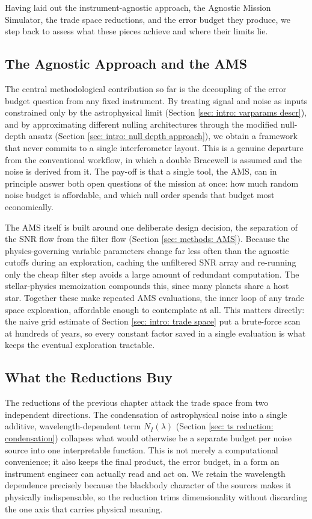 \documentclass[12pt,a4paper]{article}
\numberwithin{equation}{section}
\numberwithin{figure}{section}
\numberwithin{table}{section}
\begin{document}
Having laid out the instrument-agnostic approach, the Agnostic Mission Simulator, the trade space reductions, and the error budget they produce, we step back to assess what these pieces achieve and where their limits lie.

\subsection{The Agnostic Approach and the AMS}
The central methodological contribution so far is the decoupling of the error budget question from any fixed instrument. By treating signal and noise as inputs constrained only by the astrophysical limit (Section \ref{sec: intro: varparams descr}), and by approximating different nulling architectures through the modified null-depth ansatz (Section \ref{sec: intro: null depth approach}), we obtain a framework that never commits to a single interferometer layout. This is a genuine departure from the conventional workflow, in which a double Bracewell is assumed and the noise is derived from it. The pay-off is that a single tool, the AMS, can in principle answer both open questions of the mission at once: how much random noise budget is affordable, and which null order spends that budget most economically.

The AMS itself is built around one deliberate design decision, the separation of the SNR flow from the filter flow (Section \ref{sec: methods: AMS}). Because the physics-governing variable parameters change far less often than the agnostic cutoffs during an exploration, caching the unfiltered SNR array and re-running only the cheap filter step avoids a large amount of redundant computation. The stellar-physics memoization compounds this, since many planets share a host star. Together these make repeated AMS evaluations, the inner loop of any trade space exploration, affordable enough to contemplate at all. This matters directly: the naive grid estimate of Section \ref{sec: intro: trade space} put a brute-force scan at hundreds of years, so every constant factor saved in a single evaluation is what keeps the eventual exploration tractable.

\subsection{What the Reductions Buy}
The reductions of the previous chapter attack the trade space from two independent directions. The condensation of astrophysical noise into a single additive, wavelength-dependent term $N_I(\lambda)$ (Section \ref{sec: ts reduction: condensation}) collapses what would otherwise be a separate budget per noise source into one interpretable function. This is not merely a computational convenience; it also keeps the final product, the error budget, in a form an instrument engineer can actually read and act on. We retain the wavelength dependence precisely because the blackbody character of the sources makes it physically indispensable, so the reduction trims dimensionality without discarding the one axis that carries physical meaning.
\end{document}
